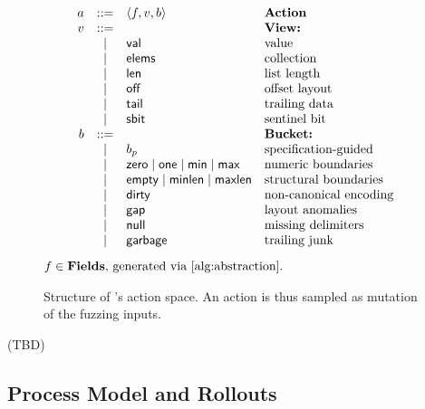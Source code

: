 \begin{figure}[t]
    \centering
    \small
     \[
        \begin{array}{r c l l}
            a & ::=  & \left\langle f,v,b \right\rangle & \textbf{Action}\\  
            v & ::=  & & \textbf{View:} \\
              & \mid & {\sf val} & \text{value} \\ 
              & \mid & {\sf elems} & \text{collection} \\ 
              & \mid & {\sf len} & \text{list length} \\ 
              & \mid & {\sf off} & \text{offset layout} \\ 
              & \mid & {\sf tail} & \text{trailing data} \\ 
              & \mid & {\sf sbit} & \text{sentinel bit} \\ 
            b & ::=  & & \textbf{Bucket:} \\
              & \mid & b_p & \text{specification-guided} \\ 
              & \mid & {\sf zero} \mid {\sf one} \mid {\sf min} \mid {\sf max} & \text{numeric boundaries} \\ 
              & \mid & {\sf empty} \mid {\sf minlen} \mid {\sf maxlen} & \text{structural boundaries} \\ 
              & \mid & {\sf dirty} & \text{non-canonical encoding} \\ 
              & \mid & {\sf gap} & \text{layout anomalies} \\ 
              & \mid & {\sf null} & \text{missing delimiters} \\ 
              & \mid & {\sf garbage} & \text{trailing junk} \\ 
        \end{array}
    \]
    $f \in \textbf{Fields}\text{, generated via \autoref{alg:abstraction}.}$
    \caption{Structure of \tool's action space. An action is thus sampled as mutation of the fuzzing inputs.}
    \label{fig:mutation-ir}
\end{figure}

\begin{example}[Mutation]
    (TBD)
\end{example}

\subsection{Process Model and Rollouts}
\label{sec:process_model}

